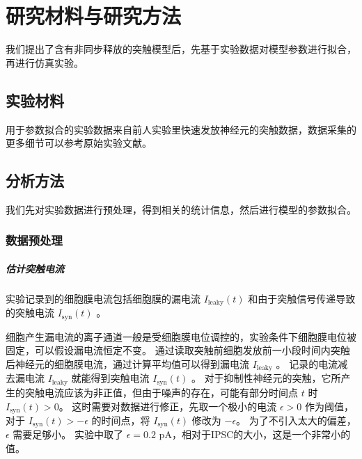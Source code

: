 \chapter{研究材料与研究方法}
\label{chapter:methods}

我们提出了含有非同步释放的突触模型后，先基于实验数据对模型参数进行拟合，再进行仿真实验。

\section{实验材料}
\label{section:methods:materials}

用于参数拟合的实验数据来自前人实验里快速发放神经元的突触数据，数据采集的更多细节可以参考原始实验文献\cite{Jiang2012}。

\section{分析方法}
\label{section:methods:methods}

我们先对实验数据进行预处理，得到相关的统计信息，然后进行模型的参数拟合。

\subsection{数据预处理}
\label{section:methods:data-preprocessing}

\paragraph{估计突触电流}
实验记录到的细胞膜电流包括细胞膜的漏电流 $I_\text{leaky}(t)$ 和由于突触信号传递导致的突触电流 $I_\text{syn}(t)$ 。

细胞产生漏电流的离子通道一般是受细胞膜电位调控的，实验条件下细胞膜电位被固定，可以假设漏电流恒定不变。
通过读取突触前细胞发放前一小段时间内突触后神经元的细胞膜电流，通过计算平均值可以得到漏电流 $I_\text{leaky}$ 。
记录的电流减去漏电流 $I_\text{leaky}$ 就能得到突触电流 $I_\text{syn}(t)$ 。
对于抑制性神经元的突触，它所产生的突触电流应该为非正值，但由于噪声的存在，可能有部分时间点 $t$ 时 $I_\text{syn}(t) > 0$。
这时需要对数据进行修正，先取一个极小的电流 $\epsilon > 0$ 作为阈值，对于 $I_\text{syn}(t) > -\epsilon$ 的时间点，将 $I_\text{syn}(t)$ 修改为 $-\epsilon$。
为了不引入太大的偏差， $\epsilon$ 需要足够小。
实验中取了 $\epsilon = 0.2$ pA，相对于IPSC的大小，这是一个非常小的值。

